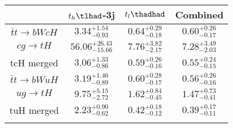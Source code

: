 \begin{tabular}{cccc} \toprule\toprule
 & $t_h\tlhad$-3j & $t_l\thadhad$ & Combined\\\midrule
$\bar{t}t\to bWcH$ & $3.34^{+1.54}_{-0.93}$ & $0.64^{+0.29}_{-0.18}$ & $0.60^{+0.26}_{-0.17}$\\
$cg\to tH$ & $56.06^{+26.43}_{-15.66}$ & $7.76^{+3.82}_{-2.17}$ & $7.28^{+3.49}_{-2.03}$\\
tcH merged & $3.06^{+1.33}_{-0.86}$ & $0.59^{+0.26}_{-0.16}$ & $0.55^{+0.24}_{-0.15}$\\
$\bar{t}t\to bWuH$ & $3.19^{+1.46}_{-0.89}$ & $0.60^{+0.28}_{-0.17}$ & $0.56^{+0.26}_{-0.16}$\\
$ug\to tH$ & $9.75^{+5.15}_{-2.72}$ & $1.62^{+0.84}_{-0.45}$ & $1.47^{+0.73}_{-0.41}$\\
tuH merged & $2.23^{+0.90}_{-0.62}$ & $0.42^{+0.18}_{-0.12}$ & $0.39^{+0.17}_{-0.11}$\\
\bottomrule\bottomrule\\
\end{tabular}